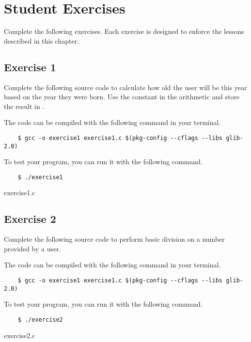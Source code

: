 \section{Student Exercises}

Complete the following exercises. Each exercise is designed to enforce the
lessons described in this chapter.


\subsection{Exercise 1}
Complete the following source code to calculate how old the user will be this
year based on the year they were born. Use the constant  in
the arithmetic and store the result in .

The code can be compiled with the following command in your terminal.

\begin{Verbatim}
    $ gcc -o exercise1 exercise1.c $(pkg-config --cflags --libs glib-2.0)
\end{Verbatim}

To test your program, you can run it with the following command.

\begin{Verbatim}
    $ ./exercise1
\end{Verbatim}

\begin{code}{exercise1.c}

\end{code}


\subsection{Exercise 2}
Complete the following source code to perform basic division on a number
provided by a user.

The code can be compiled with the following command in your terminal.

\begin{Verbatim}
    $ gcc -o exercise1 exercise1.c $(pkg-config --cflags --libs glib-2.0)
\end{Verbatim}

To test your program, you can run it with the following command.

\begin{Verbatim}
    $ ./exercise2
\end{Verbatim}

\begin{code}{exercise2.c}

\end{code}
